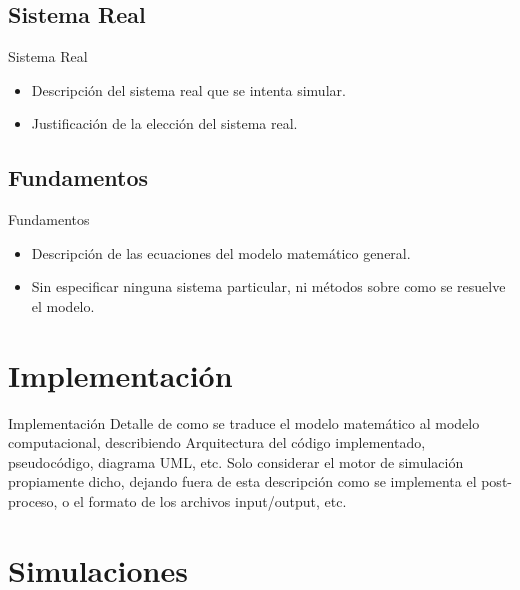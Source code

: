 \documentclass{beamer}
\begin{document}
    \subsection{Sistema Real}

    \begin{frame}{Sistema Real}
        \begin{itemize}
            \item
            Descripción del sistema real que se intenta simular.
            \item
            Justificación de la elección del sistema real.
        \end{itemize}
    \end{frame}

    \subsection{Fundamentos}

    \begin{frame}{Fundamentos}
        \begin{itemize}
            \item
            Descripción de las ecuaciones del modelo matemático general.
            \item
            Sin especificar ninguna sistema particular, ni métodos sobre como se resuelve el modelo.
        \end{itemize}
    \end{frame}

    \section{Implementación}

    \begin{frame}{Implementación}
        Detalle de como se traduce el modelo matemático al modelo computacional,
        describiendo Arquitectura del código implementado, pseudocódigo, diagrama UML, etc.
        Solo considerar el motor de simulación propiamente dicho, dejando fuera de esta descripción
        como se implementa el post-proceso, o el formato de los archivos input/output, etc.
    \end{frame}

    \section{Simulaciones}
\end{document}
